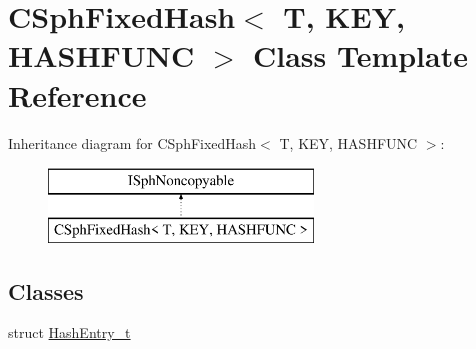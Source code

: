 \hypertarget{classCSphFixedHash}{\section{C\-Sph\-Fixed\-Hash$<$ T, K\-E\-Y, H\-A\-S\-H\-F\-U\-N\-C $>$ Class Template Reference}
\label{classCSphFixedHash}
}
Inheritance diagram for C\-Sph\-Fixed\-Hash$<$ T, K\-E\-Y, H\-A\-S\-H\-F\-U\-N\-C $>$\-:\begin{figure}[H]
\begin{center}
\leavevmode
\includegraphics[height=2.000000cm]{classCSphFixedHash}
\end{center}
\end{figure}
\subsection*{Classes}
\begin{DoxyCompactItemize}
\item 
struct \hyperlink{structCSphFixedHash_1_1HashEntry__t}{Hash\-Entry\-\_\-t}
\end{DoxyCompactItemize}
